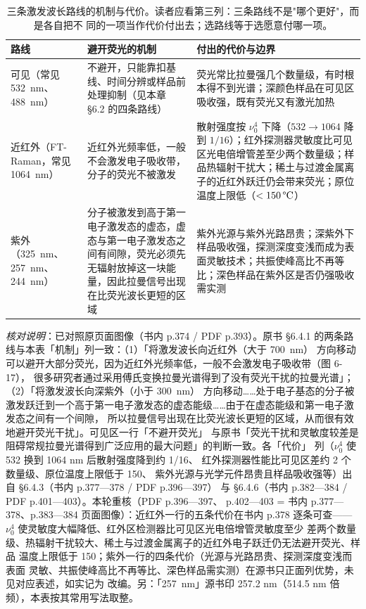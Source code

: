 \begin{table}[htbp]
\centering
\caption{三条激发波长路线的机制与代价。读者应看第三列：三条路线不是"哪个更好"，而是各自把不
同的一项当作代价付出去；选路线等于选愿意付哪一项。}
\label{tab:raman-routes}
{\srcsize
\begin{tabularx}{\columnwidth}{@{}lXX@{}}
\toprule
路线 & 避开荧光的机制 & 付出的代价与边界 \\
\midrule
可见（常见 \qty{532}{nm}、\qty{488}{nm}） & 不避开，只能靠扣基线、时间分辨或样品前处理抑制（见本章 §6.2 的四条路线） & 荧光常比拉曼强几个数量级，有时根本得不到光谱；深颜色样品在可见区吸收强，既有荧光又有激光加热 \\
近红外（FT-Raman，常见 \qty{1064}{nm}） & 近红外光频率低，一般不会激发电子吸收带，分子的荧光不被激发 & 散射强度按 $\nu_0^4$ 下降（$532\to1064$ 降到 $1/16$）；红外探测器灵敏度比可见区光电倍增管差至少两个数量级；样品热辐射干扰大；稀土与过渡金属离子的近红外跃迁仍会带来荧光；原位温度上限低（$<\qty{150}{\degC}$） \\
紫外（\qty{325}{nm}、\qty{257}{nm}、\qty{244}{nm}） & 分子被激发到高于第一电子激发态的虚态，虚态与第一电子激发态之间有间隙，荧光必须先无辐射放掉这一块能量，因此拉曼信号出现在比荧光波长更短的区域 & 紫外光源与紫外光路昂贵；深紫外下样品吸收强，探测深度变浅而成为表面灵敏技术；共振使峰高比不再等比；深色样品在紫外区是否仍强吸收需实测 \\
\bottomrule
\end{tabularx}}
\end{table}

\emph{核对说明}：已对照原页面图像（书内 p.374 / PDF p.393）。原书 §6.4.1
的两条路线与本表「机制」列一致：（1）「将激发波长向近红外（大于 \qty{700}{nm}）
方向移动可以避开大部分荧光，因为近红外光频率低，一般不会激发电子吸收带（图 6-17），
很多研究者通过采用傅氏变换拉曼光谱得到了没有荧光干扰的拉曼光谱」；（2）「将激发波长向深紫外（小于
\qty{300}{nm}）
方向移动……处于电子基态的分子被激发跃迁到一个高于第一电子激发态的虚态能级……由于在虚态能级和第一电子激发态之间有一个间隙，
所以拉曼信号出现在比荧光波长更短的区域，从而很有效地避开荧光干扰」。可见区一行「不避开荧光」
与原书「荧光干扰和灵敏度较差是阻碍常规拉曼光谱得到广泛应用的最大问题」的判断一致。各「代价」
列（$\nu_{0}^{4}$ 使 532 换到 1064 nm 后散射强度降到约 1/16、
红外探测器性能比可见区差约 2 个数量级、原位温度上限低于 \qty{150}{\degC}、
紫外光源与光学元件昂贵且样品吸收强等）出自 §6.4.3（书内 p.377—378 / PDF p.396—397）
与 §6.4.6（书内 p.382—384 / PDF p.401—403）。本轮重核（PDF p.396—397、
p.402—403 = 书内 p.377—378、p.383—384 页面图像）：近红外一行的五条代价在书内
p.378 逐条可查——$\nu_0^4$ 使灵敏度大幅降低、红外区检测器比可见区光电倍增管灵敏度至少
差两个数量级、热辐射干扰较大、稀土与过渡金属离子的近红外电子跃迁仍无法避开荧光、样品
温度上限低于 \qty{150}{\degC}；紫外一行的四条代价（光源与光路昂贵、探测深度变浅而表面
灵敏、共振使峰高比不再等比、深色样品需实测）在源书只正面列优势，未见对应表述，如实记为
改编。另：「\qty{257}{nm}」源书印 257.2 nm（514.5 nm 倍频），本表按其常用写法取整。


